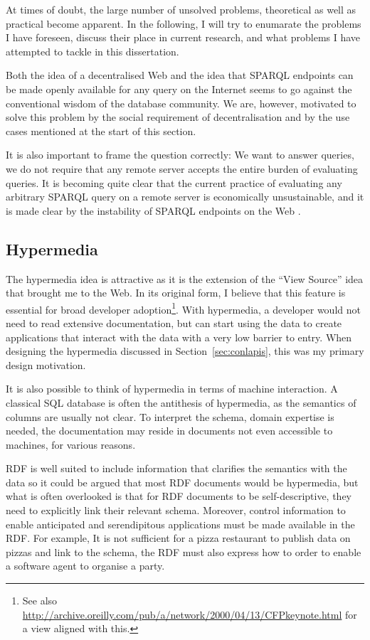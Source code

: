 At times of doubt, the large number of unsolved problems, theoretical
as well as practical become apparent. In the following, I will try to
enumarate the problems I have foreseen, discuss their place in current
research, and what problems I have attempted to tackle in this
dissertation.

Both the idea of a decentralised Web and the idea that SPARQL
endpoints can be made openly available for any query on the Internet
seems to go against the conventional wisdom of the database
community. We are, however, motivated to solve this problem by the
social requirement of decentralisation and by the use cases mentioned
at the start of this section.

It is also important to frame the question correctly: We want to
answer queries, we do not require that any remote server accepts the
entire burden of evaluating queries. It is becoming quite clear that
the current practice of evaluating any arbitrary SPARQL query on a
remote server is economically unsustainable, and it is made clear by
the instability of SPARQL endpoints on the Web \cite{buil2013sparql}.

\subsection{Hypermedia}

The hypermedia idea is attractive as it is the extension of the ``View
Source'' idea that brought me to the Web. In its original form, I
believe that this feature is essential for broad developer
adoption\footnote{See also
  \url{http://archive.oreilly.com/pub/a/network/2000/04/13/CFPkeynote.html}
  for a view aligned with this.}. With hypermedia, a developer would
not need to read extensive documentation, but can start using the data
to create applications that interact with the data with a very low
barrier to entry. When designing the hypermedia discussed in
Section~\ref{sec:conlapis}, this was my primary design motivation. 

It is also possible to think of hypermedia in terms of machine
interaction. A classical SQL database is often the antithesis of
hypermedia, as the semantics of columns are usually not clear. To
interpret the schema, domain expertise is needed, the documentation
may reside in documents not even accessible to machines, for various
reasons.

RDF is well suited to include information that clarifies the semantics
with the data so it could be argued that most RDF documents would be
hypermedia, but what is often overlooked is that for RDF documents to
be self-descriptive, they need to explicitly link their relevant
schema. Moreover, control information to enable anticipated and
serendipitous applications must be made available in the RDF. For
example, It is not sufficient for a pizza restaurant to publish data
on pizzas and link to the schema, the RDF must also express how to
order to enable a software agent to organise a party.

